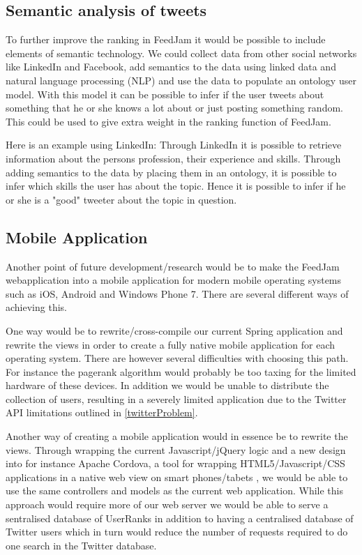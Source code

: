 \subsection{Semantic analysis of tweets} %
\label{semtanticAnalysation}
To further improve the ranking in FeedJam it would be possible to include elements of semantic technology. We could collect data from other social networks like LinkedIn and Facebook, add semantics to the data using linked data and natural language processing (NLP) and use the data to populate an ontology user model. With this model it can be possible to infer if the user tweets about something that he or she knows a lot about or just posting something random. This could be used to give extra weight in the ranking function of FeedJam. 

Here is an example using LinkedIn: Through LinkedIn it is possible to retrieve information about the persons profession, their experience and skills. Through adding semantics to the data by placing them in an ontology, it is possible to infer which skills the user has about the topic. Hence it is possible to infer if he or she is a "good" tweeter about the topic in question.


\subsection{Mobile Application}
Another point of future development/research would be to make the FeedJam webapplication into a mobile application for modern mobile operating systems such as iOS, Android and Windows Phone 7. There are several different ways of achieving this. 

One way would be to rewrite/cross-compile our current Spring application and rewrite the views in order to create a fully native mobile application for each operating system. There are however several difficulties with choosing this path. For instance the pagerank algorithm would probably be too taxing for the limited hardware of these devices. In addition we would be unable to distribute the collection of users, resulting in a severely limited application due to the Twitter API limitations outlined in \ref{twitterProblem}.

Another way of creating a mobile application would in essence be to rewrite the views. Through wrapping the current Javascript/jQuery logic and a new design into for instance Apache Cordova, a tool for wrapping HTML5/Javascript/CSS applications in a native web view on smart phones/tabets \cite{ApacheCordova}, we would be able to use the same controllers and models as the current web application. While this approach would require more of our web server we would be able to serve a sentralised database of UserRanks in addition to having a centralised database of Twitter users which in turn would reduce the number of requests required to do one search in the Twitter database.

